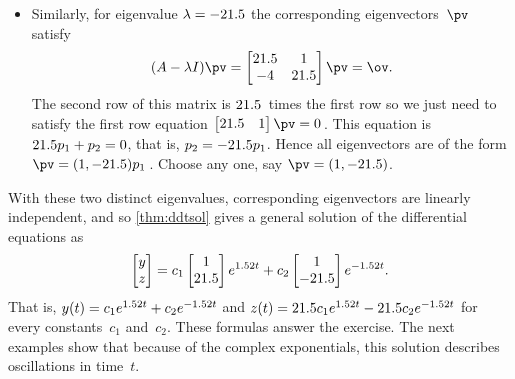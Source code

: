 \begin{example}
\begin{solution}
\begin{itemize}
\item Similarly, for eigenvalue \(\lambda=-21.5\) the corresponding eigenvectors~\(\pv\) satisfy
\begin{equation*}
(A-\lambda I)\pv=\begin{bmatrix} 2\i&1\\-4&2\i \end{bmatrix}\pv
=\ov.
\end{equation*}
The second row of this matrix is \(21.5\)~times the first row so we just need to satisfy the first row equation \(\begin{bmatrix} 2\i&1 \end{bmatrix}\pv=0\)\,.
This equation is \(21.5 p_1+p_2=0\), that is, \(p_2=-21.5 p_1\).
Hence all eigenvectors are of the form \(\pv=(1,-2\i)p_1\)\,.
Choose any one, say \(\pv=(1,-2\i)\).
\end{itemize}
With these two distinct eigenvalues, corresponding eigenvectors are linearly independent, and so \autoref{thm:ddtsol} gives a general solution of the differential equations as
\begin{equation*}
\begin{bmatrix} y\\z \end{bmatrix}
=c_1\begin{bmatrix} 1\\21.5 \end{bmatrix}e^{1.52t}
+c_2\begin{bmatrix} 1\\-21.5 \end{bmatrix}e^{-1.52t}.
\end{equation*}
That is, \(y(t)=c_1e^{1.52t}+c_2e^{-1.52t}\) and \(z(t)=21.5 c_1e^{1.52t}-21.5 c_2e^{-1.52t}\) for every constants~\(c_1\) and~\(c_2\).
These formulas answer the exercise.
The next examples show that because of the complex exponentials, this solution describes oscillations in time~\(t\).
\end{solution}
\end{example}




